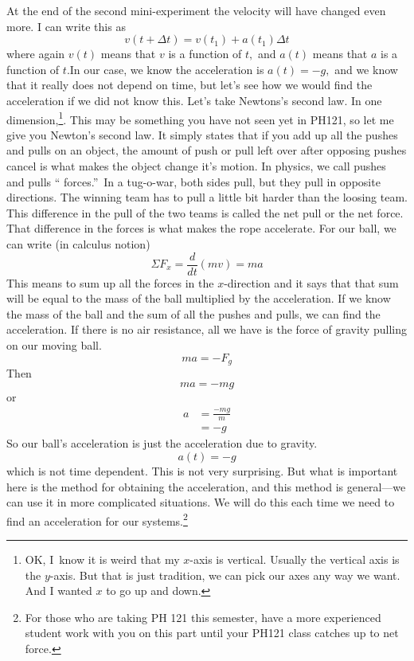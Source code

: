\documentclass[twoside,11pt,ShortChapTitles]{BYUTextbook}
\begin{document}
At the end of the second mini-experiment the velocity will have changed even
more. I can write this as
\[
v(t+\Delta t)=v(t_{1})+a(t_{1})\Delta t
\]
where again $v(t)$ means that $v$ is a function of $t,$ and $a\left(
t\right)  $ means that $a$ is a function of $t.$In our case, we know the
acceleration is $a\left(  t\right)  =-g,$ and we know that it really does not
depend on time, but let's see how we would find the acceleration if we did not
know this. Let's take Newtons's second law. In one dimension,\footnote{OK,
I\ know it is weird that my $x$-axis is vertical. Usually the vertical axis is
the $y$-axis. But that is just tradition, we can pick our axes any way we
want. And I wanted $x$ to go up and down.}. This may be something you have not
seen yet in PH121, so let me give you Newton's second law. It simply states
that if you add up all the pushes and pulls on an object, the amount of push
or pull left over after opposing pushes cancel is what makes the object change
it's motion. In physics, we call pushes and pulls \textquotedblleft
forces.\textquotedblright\ In a tug-o-war, both sides pull, but they pull in
opposite directions. The winning team has to pull a little bit harder than the
loosing team. This difference in the pull of the two teams is called the net
pull or the net force. That difference in the forces is what makes the rope
accelerate. For our ball, we can write (in calculus notion) \[
\Sigma F_{x}=\frac{d}{dt}\left(  mv\right)  =ma
\]
This means to sum up all the forces in the $x$-direction and it says that that
sum will be equal to the mass of the ball multiplied by the acceleration. If
we know the mass of the ball and the sum of all the pushes and pulls, we can
find the acceleration. If there is no air resistance, all we have is the force
of gravity pulling on our moving ball.
\[
ma=-F_{g}
\]
Then
\[
ma=-mg
\]
or \begin{align*}
a  & =\frac{-mg}{m}\\
& =-g
\end{align*}
So our ball's acceleration is just the acceleration due to gravity.
\[
a\left(  t\right)  =-g
\]
which is not time dependent. This is not very surprising. But what is
important here is the method for obtaining the acceleration, and this method
is general---we can use it in more complicated situations. We will do this
each time we need to find an acceleration for our systems.\footnote{For those
who are taking PH 121 this semester, have a more experienced student work with
you on this part until your PH121 class catches up to net force.}
\end{document}
